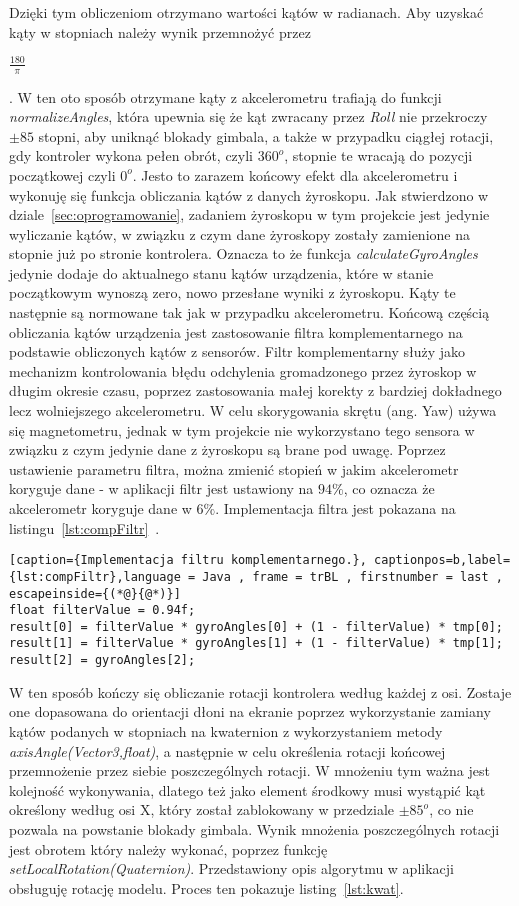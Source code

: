 Dzięki tym obliczeniom otrzymano wartości kątów w radianach. Aby uzyskać kąty w stopniach należy wynik przemnożyć przez \begin{Large}$\frac{180}{\pi}$\end{Large}. W ten oto sposób otrzymane kąty z akcelerometru trafiają do funkcji \textit{normalizeAngles}, która upewnia się że kąt zwracany przez \textit{Roll} nie przekroczy $\pm 85$ stopni, aby uniknąć blokady gimbala, a także w przypadku ciągłej rotacji, gdy kontroler wykona pełen obrót, czyli $360^o$, stopnie te wracają do pozycji początkowej czyli $0^o$. Jesto to zarazem końcowy efekt dla akcelerometru i wykonuję się funkcja obliczania kątów z danych żyroskopu. Jak stwierdzono w dziale~\ref{sec:oprogramowanie}, zadaniem żyroskopu w tym projekcie jest jedynie wyliczanie kątów, w związku z czym dane żyroskopy zostały zamienione na stopnie już po stronie kontrolera. Oznacza to że funkcja \textit{calculateGyroAngles} jedynie dodaje do aktualnego stanu kątów urządzenia, które w stanie początkowym wynoszą zero, nowo przesłane wyniki z żyroskopu. Kąty te następnie są normowane tak jak w przypadku akcelerometru. Końcową częścią obliczania kątów urządzenia jest zastosowanie filtra komplementarnego na podstawie obliczonych kątów z sensorów. Filtr komplementarny służy jako mechanizm kontrolowania błędu odchylenia gromadzonego przez żyroskop w długim okresie czasu, poprzez zastosowania małej korekty z bardziej dokładnego lecz wolniejszego akcelerometru. W celu skorygowania skrętu (ang. Yaw) używa się magnetometru, jednak w tym projekcie nie wykorzystano tego sensora w związku z czym jedynie dane z żyroskopu są brane pod uwagę. Poprzez ustawienie parametru filtra, można zmienić stopień w jakim akcelerometr koryguje dane - w aplikacji filtr jest ustawiony na $94\%$, co oznacza że akcelerometr koryguje dane w $6\%$. Implementacja filtra jest pokazana na listingu~\ref{lst:compFiltr}~\cite{gimbal}.
\begin{lstlisting}[caption={Implementacja filtru komplementarnego.}, captionpos=b,label={lst:compFiltr},language = Java , frame = trBL , firstnumber = last , escapeinside={(*@}{@*)}]     
float filterValue = 0.94f;
result[0] = filterValue * gyroAngles[0] + (1 - filterValue) * tmp[0];
result[1] = filterValue * gyroAngles[1] + (1 - filterValue) * tmp[1];
result[2] = gyroAngles[2];                                                    
\end{lstlisting}
W ten sposób kończy się obliczanie rotacji kontrolera według każdej z osi. Zostaje one dopasowana do orientacji dłoni na ekranie poprzez wykorzystanie zamiany kątów podanych w stopniach na kwaternion z wykorzystaniem metody \textit{axisAngle(Vector3,float)}, a następnie w celu określenia rotacji końcowej przemnożenie przez siebie poszczególnych rotacji. W mnożeniu tym ważna jest kolejność wykonywania, dlatego też jako element środkowy musi wystąpić kąt określony według osi X, który został zablokowany w przedziale $\pm 85^o$, co nie pozwala na powstanie blokady gimbala. Wynik mnożenia poszczególnych rotacji jest obrotem który należy wykonać, poprzez funkcję \textit{setLocalRotation(Quaternion)}. Przedstawiony opis algorytmu w aplikacji obsługuję rotację modelu. Proces ten pokazuje listing~\ref{lst:kwat}.
